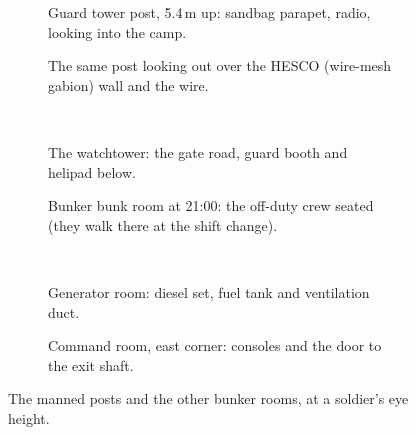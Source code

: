 \begin{figure}[p]
\centering
\begin{subfigure}[t]{0.49\linewidth}\caption{Guard tower post, 5.4\,m up: sandbag
parapet, radio, looking into the camp.}\end{subfigure}\hfill
\begin{subfigure}[t]{0.49\linewidth}\caption{The same post looking out over the
HESCO (wire-mesh gabion) wall and the wire.}\end{subfigure}\\[1.2mm]
\begin{subfigure}[t]{0.49\linewidth}\caption{The watchtower: the gate road, guard
booth and helipad below.}\end{subfigure}\hfill
\begin{subfigure}[t]{0.49\linewidth}\caption{Bunker bunk room at 21:00: the off-duty
crew seated (they walk there at the shift change).}\end{subfigure}\\[1.2mm]
\begin{subfigure}[t]{0.49\linewidth}\caption{Generator room: diesel set, fuel
tank and ventilation duct.}\end{subfigure}\hfill
\begin{subfigure}[t]{0.49\linewidth}\caption{Command room, east corner: consoles and
the door to the exit shaft.}\end{subfigure}
\caption{The manned posts and the other bunker rooms, at a soldier's eye height.}
\label{fig:walk-posts}
\end{figure}

